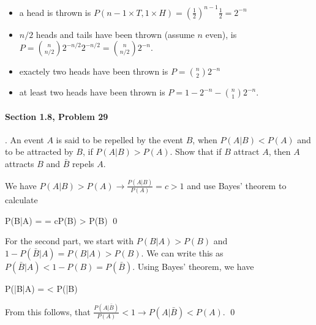 \begin{itemize}

\item a head is thrown is $P( n-1 \times T, 1 \times H) = \left(\frac{1}{2}\right)^{n-1} \frac{1}{2} = 2^{-n}$

\item $n/2$ heads and tails have been thrown (assume $n$ even), is $P = {n \choose n/2} 2^{-n/2} 2^{-n/2} = {n \choose n/2}2^{-n}$.

\item exactely two heads have been thrown is $P = {n \choose 2} 2^{-n}$

\item at least two heads have been thrown is $P = 1 - 2^{-n} - {n \choose 1} 2^{-n}$.
  
\end{itemize}


\paragraph{Section 1.8, Problem 29}. An event $A$ is said to be repelled by the event $B$, when $P(A|B) < P(A)$ and to be attracted by $B$, if $P(A|B) > P(A)$. Show that if $B$ attract $A$, then $A$ attracts $B$ and $\bar{B}$ repels $A$.

We have $P(A|B) > P(A) \rightarrow \frac{P(A|B)}{P(A)} = c > 1$ and use Bayes' theorem to calculate

\bee
P(B|A) =  = cP(B) > P(B) \qed
\eee

For the second part, we start with $P(B|A)>P(B)$ and $1 - P(\bar{B}|A) = P(B|A) > P(B)$. We can write this as $P(\bar{B}|A) < 1-P(B) = P(\bar{B})$. Using Bayes' theorem, we have

\bee
P(\bar{B}|A) =  < P(\bar{B})
\eee

From this follows, that $\frac{P(A|\bar{B})}{P(A)} < 1 \rightarrow P(A|\bar{B}) < P(A)$. \qed

